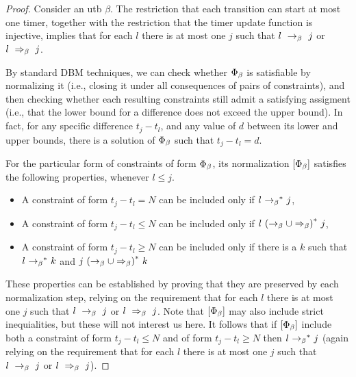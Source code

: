 \begin{proof}
  Consider an utb $\beta$.
The restriction that each transition can start at most one timer, together with
the restriction that the timer update function is injective, implies that
for each $l$ there is at most one $j$ such that
$l \ \rightarrow_{\beta} \  j$ or $l \ \Rightarrow_{\beta}\  j$.

By standard DBM techniques, we can check whether $\Phi_{\beta}$ is satisfiable by normalizing it (i.e., closing it under all consequences of
pairs of constraints),
and then checking whether each resulting constraints still
admit a satisfying assigment (i.e., that the lower bound for
a difference does not exceed the upper bound). In fact, for
any specific difference $t_j - t_l$, and any value of
$d$ between its lower and upper bounds, there is a solution
of $\Phi_{\beta}$ such that $t_j-t_l=d$.

For the particular form of constraints of form $\Phi_{\beta}$,
its normalization $[\Phi_{\beta}]$ satisfies
the following properties, whenever $l \leq j$.
\begin{itemize}
\item
A constraint of form $t_j -t_l = N$ can be included only if
  $l \ {\rightarrow_{\beta}}^*\  j$,
\item
A constraint of form $t_j -t_l \leq N$ can be included only if
  $l \ {(\rightarrow_{\beta} \cup \Rightarrow_{\beta})}^*\  j$,
\item
  A constraint of form $t_j -t_l \geq N$ can be included only if there is a $k$
  such that
  $l \ {\rightarrow_{\beta}}^*\  k$ and
  $j \ {(\rightarrow_{\beta} \cup \Rightarrow_{\beta})}^*\  k$
\end{itemize}
These properties can be established by proving that they are preserved by
each normalization step, relying on the requirement that
for each $l$ there is at most one $j$ such that
$l \ \rightarrow_{\beta} \  j$ or $l \ \Rightarrow_{\beta}\  j$.
Note that $[\Phi_{\beta}]$ may also include strict
inequialities, but these will not interest us here.
It follows that if $[\Phi_{\beta}]$ include both
a constraint of form $t_j -t_l \leq N$ and of form $t_j -t_l \geq N$
then $l \ {\rightarrow_{\beta}}^*\  j$ (again relying on the requirement that
for each $l$ there is at most one $j$ such that
$l \ \rightarrow_{\beta} \  j$ or $l \ \Rightarrow_{\beta}\  j$).


\end{proof}
